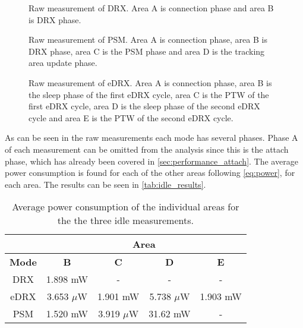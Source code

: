 \begin{minipage}{0.48\textwidth}
\begin{figure}[H]
\centering
\resizebox{\textwidth}{!}{
}
\caption{Raw measurement of \gls{DRX}. Area A is connection phase and area B is DRX phase.}
\label{fig:DRX}
\end{figure}
\vspace{0.8em}
\end{minipage}%
\hfill
\begin{minipage}{0.48\textwidth}
\begin{figure}[H]
\centering
\resizebox{\textwidth}{!}{
}
\caption{Raw measurement of \gls{PSM}. Area A is connection phase, area B is DRX phase, area C is the PSM phase and area D is the tracking area update phase.}
\label{fig:PSM}
\end{figure}
\end{minipage}
\vspace{1em}
\begin{figure}[H]
\centering
\begin{minipage}{0.48\textwidth}
\resizebox{\textwidth}{!}{
}
\caption{Raw measurement of \gls{eDRX}. Area A is connection phase, area B is the sleep phase of the first eDRX cycle, area C is the \gls{PTW} of the first eDRX cycle, area D is the sleep phase of the second eDRX cycle and area E is the \gls{PTW} of the second eDRX cycle.}
\label{fig:eDRX1}
\end{minipage}
\end{figure}

As can be seen in the raw measurements each mode has several phases. Phase A of each measurement can be omitted from the analysis since this is the attach phase, which has already been covered in \autoref{sec:performance_attach}. The average power consumption is found for each of the other areas following \autoref{eq:power}, for each area. The results can be seen in \autoref{tab:idle_results}.

\begin{table}[H]
\centering
\begin{tabular}{|c|c|c|c|c|} 
\multicolumn{1}{c}{ }	& \multicolumn{4}{c}{Area} \\ \hline
\textbf{Mode}	& \textbf{B}	& \textbf{C} 	& \textbf{D} 	& \textbf{E} \\ \hline
DRX				& 1.898 mW		& - 			& - 			& - \\ \hline
eDRX			& 3.653 $\mu$W	& 1.901 mW		& 5.738 $\mu$W	& 1.903 mW \\ \hline
PSM 			& 1.520 mW		& 3.919 $\mu$W	& 31.62 mW		& - \\ \hline 
\end{tabular}
\caption{Average power consumption of the individual areas for the the three idle measurements.}
\label{tab:idle_results}
\end{table}

